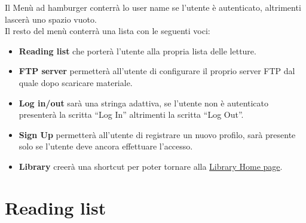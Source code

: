 \documentclass{report}
\begin{document}
Il Menù ad hamburger conterrà lo user name se l'utente è autenticato, altrimenti lascerà uno spazio vuoto.\\
Il resto del menù conterrà una lista con le seguenti voci:
\begin{itemize}
   \item \textbf{Reading list} che porterà l'utente alla propria lista delle letture.
   \item \textbf{FTP server} permetterà all'utente di configurare il proprio server FTP dal quale dopo scaricare materiale.
   \item \textbf{Log in/out} sarà una stringa adattiva, se l'utente non è autenticato presenterà la scritta ``Log In'' altrimenti la scritta ``Log Out''.
  \item \textbf{Sign Up} permetterà all'utente di registrare un nuovo profilo, sarà presente solo se l'utente deve ancora effettuare l'accesso.
  \item \textbf{Library} creerà una shortcut per poter tornare alla \hyperref[sec:home]{Library \- Home page}.
\end{itemize}

\section{Reading list}\label{sec:reading_list}
\end{document}
